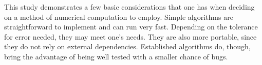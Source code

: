\documentclass{project}
\begin{document}
This study demonstrates a few basic considerations that one has when deciding on a method of numerical computation to employ. Simple algorithms are straightforward to implement and can run very fast. Depending on the tolerance for error needed, they may meet one's needs. They are also more portable, since they do not rely on external dependencies. Established algorithms do, though, bring the advantage of being well tested with a smaller chance of bugs.

\printbibliography
\end{document}
